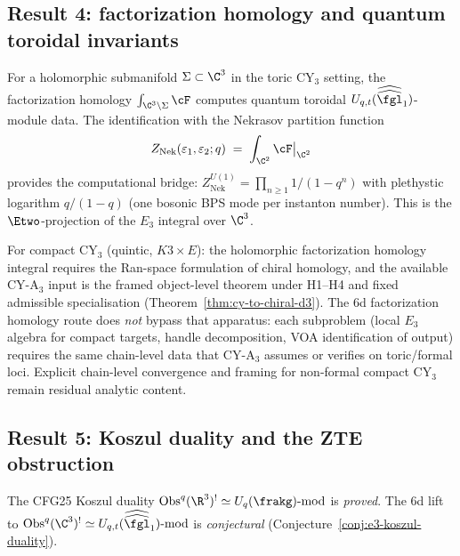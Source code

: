 \subsection{Result 4: factorization homology and quantum toroidal invariants}
\label{subsec:cfg25-result4}

\begin{conjecture}
\label{conj:cfg25-fact-hom-complement}
\ClaimStatusConjectured
For a holomorphic submanifold $\Sigma \subset \C^3$ in the toric CY$_3$ setting, the factorization homology $\int_{\C^3 \setminus \Sigma} \cF$ computes quantum toroidal $U_{q,t}(\widehat{\widehat{\fgl}}_1)$-module data. The identification with the Nekrasov partition function
\begin{equation}\label{eq:nekrasov-fact-hom-cfg25}
 Z_{\mathrm{Nek}}(\varepsilon_1, \varepsilon_2; q) \;=\; \int_{\C^2} \cF\big|_{\C^2}
\end{equation}
provides the computational bridge: $Z_{\mathrm{Nek}}^{U(1)} = \prod_{n \geq 1} 1/(1-q^n)$ with plethystic logarithm $q/(1-q)$ (one bosonic BPS mode per instanton number). This is the $\Etwo$-projection of the $E_3$ integral over $\C^3$.

For compact CY$_3$ (quintic, $K3 \times E$): the holomorphic factorization homology integral requires the Ran-space formulation of chiral homology, and the available CY-A$_3$ input is the framed object-level theorem under H1--H4 and fixed admissible specialisation \textup{(}Theorem~\ref{thm:cy-to-chiral-d3}\textup{)}. The 6d factorization homology route does \emph{not} bypass that apparatus: each subproblem (local $E_3$ algebra for compact targets, handle decomposition, VOA identification of output) requires the same chain-level data that CY-A$_3$ assumes or verifies on toric/formal loci. Explicit chain-level convergence and framing for non-formal compact CY$_3$ remain residual analytic content.
\end{conjecture}

\subsection{Result 5: Koszul duality and the ZTE obstruction}
\label{subsec:cfg25-result5}

The CFG25 Koszul duality $\mathrm{Obs}^q(\R^3)^! \simeq U_q(\frakg)\text{-mod}$ is \emph{proved}. The 6d lift to $\mathrm{Obs}^q(\C^3)^! \simeq U_{q,t}(\widehat{\widehat{\fgl}}_1)\text{-mod}$ is \emph{conjectural} (Conjecture~\ref{conj:e3-koszul-duality}).

